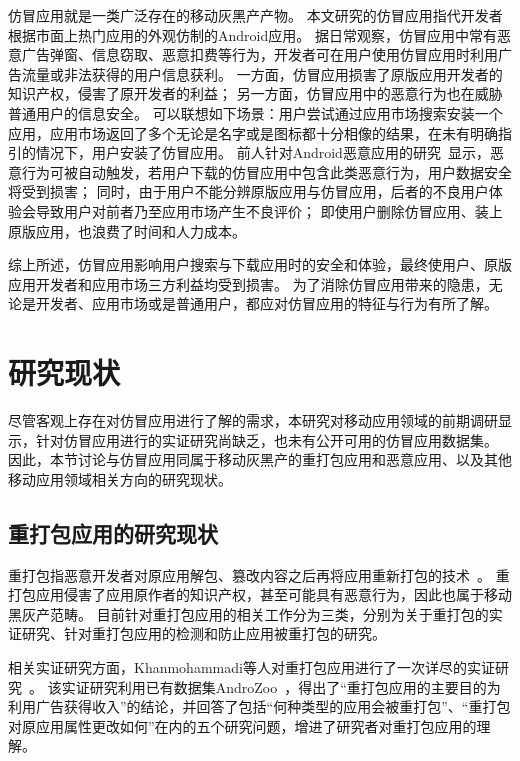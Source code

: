 仿冒应用就是一类广泛存在的移动灰黑产产物。
本文研究的仿冒应用指代开发者根据市面上热门应用的外观仿制的Android应用。
据日常观察，仿冒应用中常有恶意广告弹窗、信息窃取、恶意扣费等行为，开发者可在用户使用仿冒应用时利用广告流量或非法获得的用户信息获利。
一方面，仿冒应用损害了原版应用开发者的知识产权，侵害了原开发者的利益；
另一方面，仿冒应用中的恶意行为也在威胁普通用户的信息安全。
可以联想如下场景：用户尝试通过应用市场搜索安装一个应用，应用市场返回了多个无论是名字或是图标都十分相像的结果，在未有明确指引的情况下，用户安装了仿冒应用。
前人针对Android恶意应用的研究~\cite{Zhou2012DissectingAM}显示，恶意行为可被自动触发，若用户下载的仿冒应用中包含此类恶意行为，用户数据安全将受到损害；
同时，由于用户不能分辨原版应用与仿冒应用，后者的不良用户体验会导致用户对前者乃至应用市场产生不良评价；
即使用户删除仿冒应用、装上原版应用，也浪费了时间和人力成本。

综上所述，仿冒应用影响用户搜索与下载应用时的安全和体验，最终使用户、原版应用开发者和应用市场三方利益均受到损害。
为了消除仿冒应用带来的隐患，无论是开发者、应用市场或是普通用户，都应对仿冒应用的特征与行为有所了解。

\section{研究现状}
尽管客观上存在对仿冒应用进行了解的需求，本研究对移动应用领域的前期调研显示，针对仿冒应用进行的实证研究尚缺乏，也未有公开可用的仿冒应用数据集。
因此，本节讨论与仿冒应用同属于移动灰黑产的重打包应用和恶意应用、以及其他移动应用领域相关方向的研究现状。

\subsection{重打包应用的研究现状}
\label{sec:repackaging}
重打包指恶意开发者对原应用解包、篡改内容之后再将应用重新打包的技术~\cite{khanmohammadi2019empirical}。
重打包应用侵害了应用原作者的知识产权，甚至可能具有恶意行为，因此也属于移动黑灰产范畴。
目前针对重打包应用的相关工作分为三类，分别为关于重打包的实证研究、针对重打包应用的检测和防止应用被重打包的研究。

相关实证研究方面，Khanmohammadi等人对重打包应用进行了一次详尽的实证研究~\cite{khanmohammadi2019empirical}。
该实证研究利用已有数据集AndroZoo~\cite{li2017androzoo++}，得出了``重打包应用的主要目的为利用广告获得收入''的结论，并回答了包括``何种类型的应用会被重打包''、``重打包对原应用属性更改如何''在内的五个研究问题，增进了研究者对重打包应用的理解。


